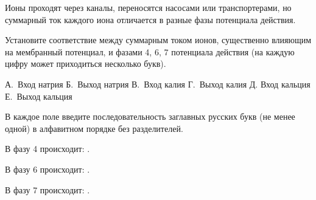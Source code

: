 
Ионы проходят через каналы, переносятся насосами или транспортерами, но суммарный ток каждого иона отличается в разные фазы потенциала действия.

Установите соответствие между суммарным током ионов, существенно влияющим на мембранный потенциал, и фазами 4, 6, 7 потенциала действия (на каждую цифру может приходиться несколько букв).


А. Вход натрия
Б. Выход натрия
В. Вход калия
Г. Выход калия
Д. Вход кальция
Е. Выход кальция

В каждое поле введите последовательность заглавных русских букв (не менее одной) в алфавитном порядке без разделителей.

В фазу 4 происходит: \underline{\hspace{2in}}. 

В фазу 6 происходит: \underline{\hspace{2in}}. 

В фазу 7 происходит: \underline{\hspace{2in}}.